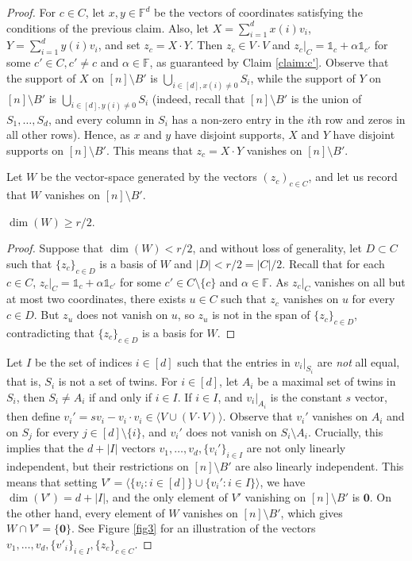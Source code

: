 \begin{proof}
		For $c\in C$, let $x,y\in\mathbb{F}^{d}$ be the vectors of coordinates  satisfying the conditions of the previous claim. Also, let $X=\sum_{i=1}^d x(i)v_i$, $Y=\sum_{i=1}^d y(i)v_i$, and set $z_{c}=X\cdot Y$. Then $z_{c}\in V\cdot V$ and $z_{c}|_{C}=\mathds{1}_c+\alpha\mathds{1}_{c'}$ for some $c'\in C,c'\neq c$ and $\alpha\in \mathbb{F}$, as guaranteed by Claim \ref{claim:c'}. Observe that the support of $X$ on $[n]\setminus B'$ is $\bigcup_{i\in [d], x(i)\neq 0}S_i$, while the support of $Y$ on $[n]\setminus B'$ is $\bigcup_{i\in [d], y(i)\neq 0}S_i$ (indeed, recall that $[n]\setminus B'$ is the union of $S_1,\dots,S_d$, and every column in $S_i$ has a non-zero entry in the $i$th row and zeros in all other rows).
		Hence, as $x$ and $y$ have disjoint supports, $X$ and $Y$ have disjoint supports on $[n]\setminus B'$. This means that $z_c=X\cdot Y$ vanishes on $[n]\setminus B'$.
		
		 Let $W$ be the vector-space generated by the vectors $(z_c)_{c\in C}$, and let us record that $W$ vanishes on $[n]\setminus B'$.
		\begin{claim}
			$\dim(W)\geq r/2.$
		\end{claim}
		\begin{proof}
			Suppose that $\dim(W) < r/2$, and without loss of generality, let $D\subset C$ such that $\{z_c\}_{c\in D}$ is a basis of $W$ and $|D|<r/2 = |C|/2$. 
			Recall that for each $c \in C$, $z_{c}|_C = \mathds{1}_c+\alpha\mathds{1}_{c'}$ for some $c'\in C \setminus \{c\}$ and $\alpha\in \mathbb{F}$.
			As $z_{c}|_C$ vanishes on all but at most two coordinates, there exists $u\in C$ such that $z_c$ vanishes on $u$ for every $c\in D$. But $z_u$ does not vanish on $u$, so $z_u$ is not in the span of $\{z_c\}_{c\in D}$, contradicting that $\{z_c\}_{c\in D}$ is a basis for $W$.
		\end{proof}
		
		Let $I$ be the set of indices $i \in [d]$ such that the entries in $v_i|_{S_i}$ are {\em not} all equal, that is, $S_i$ is not a set of twins. For $i\in [d]$, let $A_{i}$ be a maximal set of twins in $S_{i}$, then $S_{i}\neq A_{i}$ if and only if $i\in I$. If $i\in I$, and $v_i|_{A_i}$ is the constant $s$ vector, then define $v_{i}'=sv_{i}-v_{i}\cdot v_{i}\in \langle V\cup (V\cdot V)\rangle$. Observe that $v_{i}'$ vanishes on $A_{i}$ and on $S_{j}$ for every $j\in [d]\setminus\{i\}$, and $v_{i}'$ does not vanish on $S_{i}\setminus A_{i}$. 
		Crucially, this implies that the $d+|I|$ vectors $v_1,\dots,v_{d},\{v_{i}'\}_{i\in I}$ are not only linearly independent, but their restrictions on $[n]\setminus B'$ are also linearly independent. 
		This means that setting $V'=\langle \{v_{i}:i\in [d]\}\cup\{v_{i}':i\in I\}\rangle$, we have $\dim(V')=d+|I|$, and the only element of $V'$ vanishing on $[n]\setminus B'$ is $\mathbf{0}$. On the other hand, every element of $W$ vanishes on $[n]\setminus B'$, which gives $W\cap V'=\{\mathbf{0}\}$.  See Figure \ref{fig3} for an illustration of the vectors $v_1,\dots,v_d,\{v'_i\}_{i\in I},\{z_c\}_{c\in C}$.
		

\end{proof}
